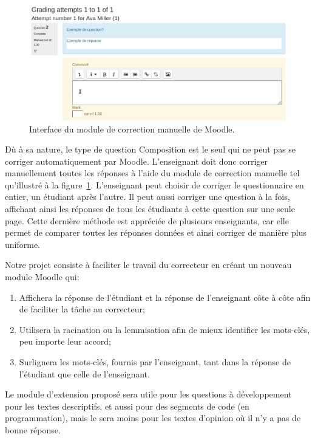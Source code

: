 \begin{figure}[htbp]
  \includegraphics[scale=0.55]{images/correction-manuelle.png}
  \caption{Interface du module de correction manuelle de Moodle.}
  \label{correction-manuelle}
\end{figure}

D\`u \`a sa nature, le type de question Composition est le seul qui ne peut pas se corriger automatiquement par Moodle.
L'enseignant doit donc corriger manuellement toutes les r\'eponses \`a l'aide du module de correction manuelle tel qu'illustr\'e \`a la figure~\ref{correction-manuelle}.
L'enseignant peut choisir de corriger le questionnaire en entier, un \'etudiant apr\`es l'autre.
Il peut aussi corriger une question \`a la fois, affichant ainsi les r\'eponses de tous les \'etudiants \`a cette question sur une seule page.
Cette derni\`ere m\'ethode est appr\'eci\'ee de plusieurs enseignants, car elle permet de comparer toutes les r\'eponses donn\'ees et ainsi corriger de mani\`ere plus uniforme.

Notre projet consiste \`a faciliter le travail du correcteur en cr\'eant un nouveau module Moodle qui:
\begin{enumerate}
  \item Affichera la r\'eponse de l'\'etudiant et la r\'eponse de l'enseignant c\^ote \`a c\^ote afin de faciliter la t\^ache au correcteur;
  \item Utilisera la racination ou la lemmisation afin de mieux identifier les mots-cl\'es, peu importe leur accord;
  \item Surlignera les mots-cl\'es, fournis par l'enseignant, tant dans la r\'eponse de l'\'etudiant que celle de l'enseignant.
\end{enumerate}
Le module d'extension propos\'e sera utile pour les questions \`a d\'eveloppement pour les textes descriptifs, et aussi pour des segments de code (en programmation), mais le sera moins pour les textes d'opinion o\`u il n'y a pas de \og bonne \fg{} r\'eponse.

